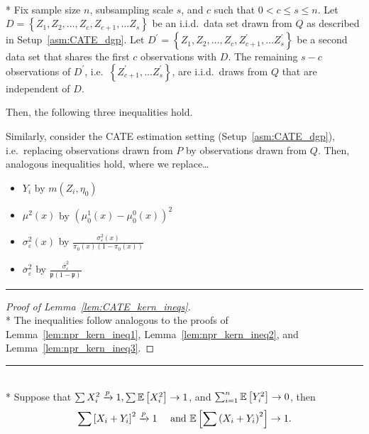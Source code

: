 \begin{lem}\label{lem:CATE_kern_ineqs}\mbox{}\\*
	Fix sample size $n$, subsampling scale $s$, and $c$ such that $0 < c \leq s \leq n$.
	Let $D = \left\{Z_1, Z_2, \dotsc, Z_c, Z_{c+1}, \dotsc Z_s \right\}$ be an i.i.d.\ data set drawn from $Q$ as described in Setup~\ref{asm:CATE_dgp}.
	Let $D^{\prime} = \left\{Z_1, Z_2, \dotsc, Z_c, Z_{c+1}^{\prime}, \dotsc Z_s^{\prime} \right\}$ be a second data set that shares the first $c$ observations with $D$.
	The remaining $s - c$ observations of $D^{\prime}$, i.e.\ $\left\{Z_{c+1}^{\prime}, \dotsc Z_s^{\prime} \right\}$, are i.i.d.\ draws from $Q$ that are independent of $D$.

	Then, the following three inequalities hold.

		
	Similarly, consider the CATE estimation setting (Setup~\ref{asm:CATE_dgp}),
	i.e.\ replacing observations drawn from $P$ by observations drawn from $Q$.
	Then, analogous inequalities hold, where we replace\dots
	\begin{multicols}{2}
		\begin{itemize}
			\item $Y_i$ by $m(Z_{i}, \eta_{0})$
			\item $\mu^2(x)$ by $\left(\mu_{0}^{1}\left(x\right) - \mu_{0}^{0}\left(x\right)\right)^2$
			\item $\sigma^{2}_{\varepsilon}(x)$ by $\frac{\sigma_{\varepsilon}^2\left(x\right)}{\pi_{0}(x)\left(1 - \pi_{0}(x)\right)}$
			\item $\overline{\sigma}^{2}_{\varepsilon}$ by $\frac{\overline{\sigma}^2_{\varepsilon}}{\mathfrak{p}\left(1 - \mathfrak{p}\right)}$
		\end{itemize}
	\end{multicols}
\end{lem}

\hrule

\begin{proof}[Proof of Lemma~\ref{lem:CATE_kern_ineqs}]\mbox{}\\*
	The inequalities follow analogous to the proofs of Lemma~\ref{lem:npr_kern_ineq1}, Lemma~\ref{lem:npr_kern_ineq2}, and Lemma~\ref{lem:npr_kern_ineq3}.
\end{proof}

\hrule

\begin{lem}\label{lem:peng1}\mbox{}\\*
	Suppose that $\sum X_{i}^2 \xrightarrow{p} 1, \sum \mathbb{E}\left[X_{i}^2\right] \rightarrow 1$, and $\sum_{i=1}^n \mathbb{E}\left[Y_{i}^2\right] \rightarrow 0$, then
	\begin{equation}
		\sum\left[X_{i}+Y_{i}\right]^2 \xrightarrow{p} 1 \quad \text { and } \mathbb{E}\left[\sum\left(X_{i}+Y_{i}\right)^2\right] \rightarrow 1.
	\end{equation}
\end{lem}

